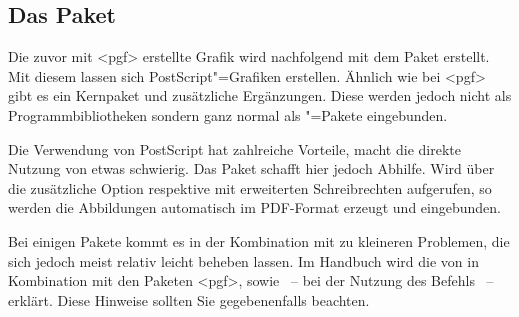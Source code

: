\documentclass[%
  english,ngerman,%
  cdgeometry=no,DIV=12,automark,%
]{tudscrartcl}
\begin{document}
\subsection{Das Paket }
Die zuvor mit <pgf> erstellte Grafik wird nachfolgend mit dem 
Paket  erstellt. Mit diesem lassen sich PostScript"=Grafiken 
erstellen. Ähnlich wie bei <pgf> gibt es ein Kernpaket und 
zusätzliche Ergänzungen. Diese werden jedoch nicht als Programmbibliotheken 
sondern ganz normal als "=Pakete eingebunden.
%
\begin{Hint}
\usepackage{pstricks}
\usepackage{pst-node}
\end{Hint}
%
Die Verwendung von PostScript hat zahlreiche Vorteile, macht die direkte 
Nutzung von  etwas schwierig. Das Paket  
schafft hier jedoch Abhilfe. Wird  über die zusätzliche Option 
 respektive  mit erweiterten 
Schreibrechten aufgerufen, so werden die Abbildungen automatisch im PDF-Format 
erzeugt und eingebunden.
%
\begin{Hint}
\usepackage{auto-pst-pdf}
\end{Hint}
%
Bei einigen Pakete kommt es in der Kombination mit  zu 
kleineren Problemen, die sich jedoch meist relativ leicht beheben lassen. Im 
Handbuch wird die  
von  in Kombination mit den Paketen <pgf>, 
 sowie ~-- bei der Nutzung des Befehls 
~-- erklärt. Diese Hinweise sollten Sie gegebenenfalls beachten.
\end{document}
